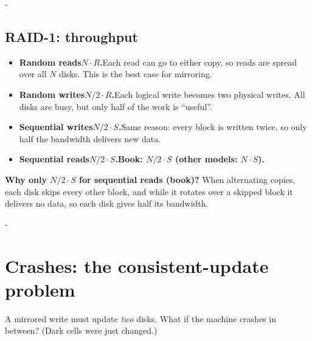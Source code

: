 \documentclass[11pt,a4paper]{article}
\makeatletter
\newcommand{\keepspace}[1]{\par\penalty-100\begingroup
  \setlength{\dimen@}{#1}\dimen@ii\pagegoal\advance\dimen@ii-\pagetotal
  \ifdim\dimen@>\dimen@ii\ifdim\dimen@ii>\z@\vfil\fi\break\fi\endgroup}
\makeatother
\begin{document}
\keepspace{9\baselineskip}
\subsection{RAID-1: throughput}

\begin{quizbox}
\begin{itemize}
  \item \textbf{Random reads}\quad \textbf{\(N \cdot R\).}\enspace Each read can go to either copy, so reads are spread over all \(N\) disks. This is the best case for mirroring.
  \item \textbf{Random writes}\quad \textbf{\(N/2 \cdot R\).}\enspace Each logical write becomes two physical writes. All disks are busy, but only half of the work is ``useful''.
  \item \textbf{Sequential writes}\quad \textbf{\(N/2 \cdot S\).}\enspace Same reason: every block is written twice, so only half the bandwidth delivers new data.
  \item \textbf{Sequential reads}\quad \textbf{\(N/2 \cdot S\).}\enspace \textbf{Book: \(N/2\cdot S\) (other models: \(N \cdot S\)).}
\end{itemize}
\end{quizbox}

\textbf{Why only \(N/2 \cdot S\) for sequential reads (book)?} When alternating
copies, each disk skips every other block, and while it rotates over a
skipped block it delivers no data, so each disk gives half its bandwidth.

\keepspace{9\baselineskip}
\section{Crashes: the consistent-update problem}

A mirrored write must update \emph{two} disks. What if the machine crashes
in between? (Dark cells were just changed.)
\end{document}
